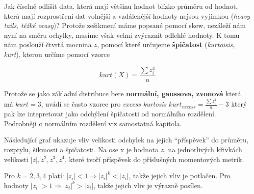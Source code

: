 \documentclass[
  czech,
  11pt,
  letterpaper,
  DIV=11,
  numbers=noendperiod]{scrreprt}
\begin{document}
Jak číselně odlišit data, která mají většinu hodnot blízko průměru od
hodnot, která mají rozprostření dat volnější a vzdálenější hodnoty
nejsou vyjímkou (\emph{heavy tails, těžké ocasy})? Protože zešikmení
máme popsané pomocí skew, nezáleží nám nyní na směru ochylky, musíme
však velmi zvýraznit odlehlé hodnoty. K tomu nám poslouží čtvrtá mocnina
\(z\), pomocí které určujeme \textbf{špičatost} (\emph{kurtoisis,
kurt}), kterou určíme pomocí vzorce

\[
  kurt(X) = \frac{\sum z_i^4}{n}
\]

Protože se jako základní distribuce bere \textbf{normální, gaussova,
zvonová} která má \(kurt=3\), uvádí se často vzorec pro \emph{excess
kurtosis} \(kurt_{excess}=\frac{\sum z_i^4}{n}-3\) který pak lze
intepretovat jako odchýlení špičatosti od normálního rozdělení.
Podrobněji o normálním rozdělení viz samostatná kapitola.

Následující graf ukazuje vliv velikosti odchylek na jejich ``příspěvek''
do průměru, rozptylu, šikmosti a špičatosti. Na ose x je hodnota \(z\),
na jednotlivých křivkách velikosti \(|z|,z^2,z^3,z^4\), které tvoří
příspěvek do příslušných momentových metrik.

Pro \(k={2,3,4}\) platí: \(|z_i|<1\Longrightarrow |z_i|^k<|z_i|\), takže
jejich vliv je potlačen. Pro hodnoty
\(|z_i|>1\Longrightarrow |z_i|^k > |z_i|\), takže jejich vliv je výrazně
posílen.
\end{document}
